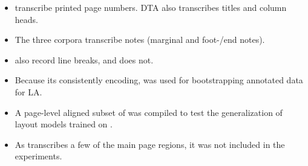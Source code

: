 {\begin{itemize}
  \item {} transcribe printed page numbers. DTA also
    transcribes
    titles
    and column heads.
    
    
  \item The three corpora transcribe notes (marginal and foot-/end notes).


  \item {} also record line breaks, and  does not. 

  \item Because its consistently encoding,  was used for
    bootstrapping annotated data for LA.
    
  \item A page-level aligned subset of  was compiled to test the
    generalization of layout models trained on .

  \item As  transcribes a few of the main page regions, it was not included in the experiments.

  \end{itemize}
  
  \vspace{-.5em}
}

